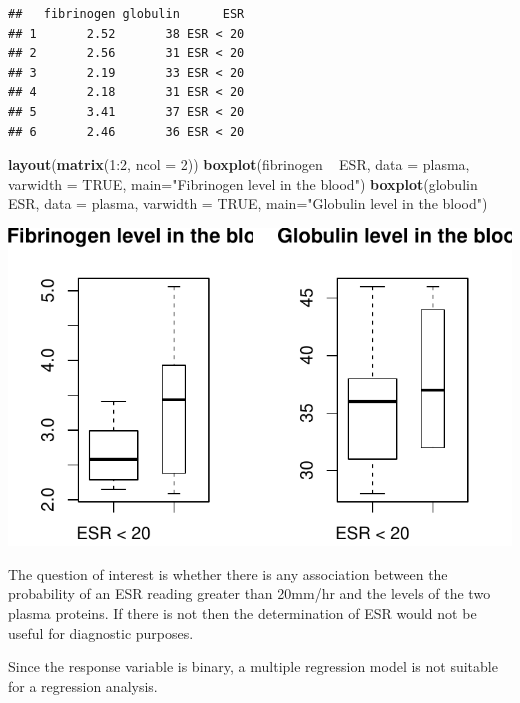 \documentclass[]{article}
\newenvironment{Shaded}{\begin{snugshade}}{\end{snugshade}}
\newcommand{\KeywordTok}[1]{\textcolor[rgb]{0.13,0.29,0.53}{\textbf{{#1}}}}
\newcommand{\DataTypeTok}[1]{\textcolor[rgb]{0.13,0.29,0.53}{{#1}}}
\newcommand{\DecValTok}[1]{\textcolor[rgb]{0.00,0.00,0.81}{{#1}}}
\newcommand{\StringTok}[1]{\textcolor[rgb]{0.31,0.60,0.02}{{#1}}}
\newcommand{\OtherTok}[1]{\textcolor[rgb]{0.56,0.35,0.01}{{#1}}}
\newcommand{\NormalTok}[1]{{#1}}
\numberwithin{equation}{section}
\begin{document}
\begin{verbatim}
##   fibrinogen globulin      ESR
## 1       2.52       38 ESR < 20
## 2       2.56       31 ESR < 20
## 3       2.19       33 ESR < 20
## 4       2.18       31 ESR < 20
## 5       3.41       37 ESR < 20
## 6       2.46       36 ESR < 20
\end{verbatim}

\begin{Shaded}
\begin{Highlighting}[]
\KeywordTok{layout}\NormalTok{(}\KeywordTok{matrix}\NormalTok{(}\DecValTok{1}\NormalTok{:}\DecValTok{2}\NormalTok{, }\DataTypeTok{ncol =} \DecValTok{2}\NormalTok{))}
\KeywordTok{boxplot}\NormalTok{(fibrinogen ~}\StringTok{ }\NormalTok{ESR, }\DataTypeTok{data =} \NormalTok{plasma, }\DataTypeTok{varwidth =} \OtherTok{TRUE}\NormalTok{, }\DataTypeTok{main=}\StringTok{"Fibrinogen level in the blood"}\NormalTok{)}
\KeywordTok{boxplot}\NormalTok{(globulin ~}\StringTok{ }\NormalTok{ESR, }\DataTypeTok{data =} \NormalTok{plasma, }\DataTypeTok{varwidth =} \OtherTok{TRUE}\NormalTok{, }\DataTypeTok{main=}\StringTok{"Globulin level in the blood"}\NormalTok{)}
\end{Highlighting}
\end{Shaded}

\includegraphics{index_files/figure-latex/unnamed-chunk-226-1.pdf}

The question of interest is whether there is any association between the
probability of an ESR reading greater than 20mm/hr and the levels of the
two plasma proteins. If there is not then the determination of ESR would
not be useful for diagnostic purposes.

Since the response variable is binary, a multiple regression model is
not suitable for a regression analysis.
\end{document}
